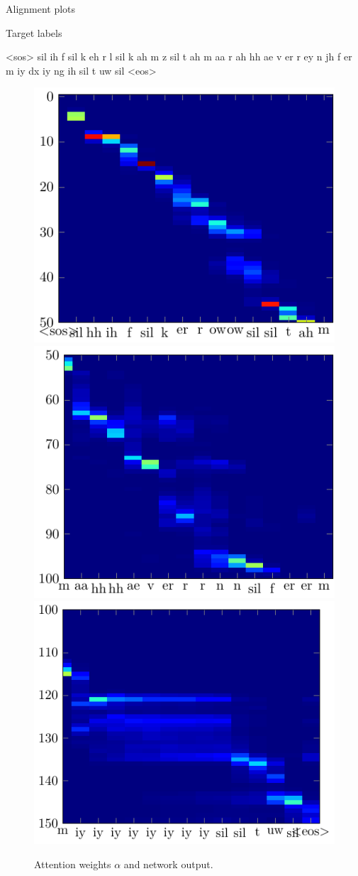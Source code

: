 \documentclass[10pt]{beamer}
\begin{document}
\begin{frame}{Alignment plots}
	\begin{block}{Target labels}
		\begin{semiverbatim}
		<sos>  sil  ih  f  sil  k  eh  r  l  sil  k  ah  m  z
		       sil  t  ah  m  aa  r  ah  hh  ae  v  er  r  ey
		       n  jh  f  er  m  iy  dx  iy  ng  ih
		       sil  t  uw  sil
		<eos>
		\end{semiverbatim}
	\end{block}

	\begin{figure}
	\centering
	\includegraphics[height=0.26\linewidth]{../tikz/alphaZoom}
	\includegraphics[height=0.26\linewidth]{../tikz/alphaZoom2}
	\includegraphics[height=0.26\linewidth]{../tikz/alphaZoom3}
	\caption{Attention weights $\alpha$ and network output.}
	\label{fig:attention3}
	\end{figure}
\end{frame}
\end{document}
